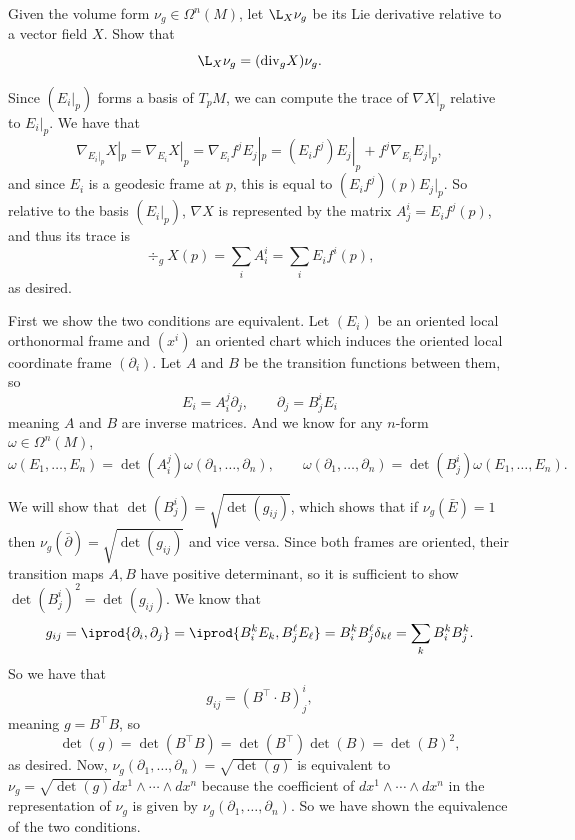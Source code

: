         \item Given the volume form $\nu_g\in\Omega^n(M)$, let $\L_X\nu_g$ be its Lie derivative relative to a vector field $X$.
        Show that
        $$ \L_X\nu_g = (\div_gX)\nu_g . $$
    \eenum

\eprob

\benum
    \item Since $(E_i|_p)$ forms a basis of $T_pM$, we can compute the trace of $\nabla X|_p$ relative to $E_i|_p$.
    We have that
    $$ \nabla_{E_i|_p}X|_p = \nabla_{E_i}X|_p = \nabla_{E_i}f^jE_j|_p = (E_if^j)E_j|_p + f^j\nabla_{E_i}E_j|_p , $$
    and since $E_i$ is a geodesic frame at $p$, this is equal to $(E_if^j)(p)E_j|_p$.
    So relative to the basis $(E_i|_p)$, $\nabla X$ is represented by the matrix $A^i_j=E_if^j(p)$, and thus its trace is
    $$ \div_gX(p) = \sum_i A^i_i = \sum_i E_if^i(p) , $$
    as desired.

    \item First we show the two conditions are equivalent.
    Let $(E_i)$ be an oriented local orthonormal frame and $(x^i)$ an oriented chart which induces the oriented local coordinate frame $(\partial_i)$.
    Let $A$ and $B$ be the transition functions between them, so
    $$ E_i = A^j_i\partial_j,\qquad \partial_j = B^i_jE_i $$
    meaning $A$ and $B$ are inverse matrices.
    And we know for any $n$-form $\omega\in\Omega^n(M)$,
    $$ \omega(E_1,\dots,E_n) = \det(A^j_i)\omega(\partial_1,\dots,\partial_n),\qquad \omega(\partial_1,\dots,\partial_n) = \det(B^i_j)\omega(E_1,\dots,E_n) . $$

    We will show that $\det(B^i_j)=\sqrt{\det(g_{ij})}$, which shows that if $\nu_g(\bar E)=1$ then $\nu_g(\bar\partial)=\sqrt{\det(g_{ij})}$ and vice versa.
    Since both frames are oriented, their transition maps $A,B$ have positive determinant, so it is sufficient to show $\det(B^i_j)^2=\det(g_{ij})$.
    We know that
    $$ g_{ij} = \iprod{\partial_i,\partial_j} = \iprod{B^k_iE_k,B^\ell_jE_\ell} = B^k_iB^\ell_j\delta_{k\ell} = \sum_k B^k_iB^k_j . $$
    So we have that
    $$ g_{ij} = (B^\top\cdot B)^i_j , $$
    meaning $g=B^\top B$, so
    $$ \det(g) = \det(B^\top B) = \det(B^\top)\det(B) = \det(B)^2 , $$
    as desired.
    Now, $\nu_g(\partial_1,\dots,\partial_n)=\sqrt{\det(g)}$ is equivalent to $\nu_g=\sqrt{\det(g)}dx^1\wedge\cdots\wedge dx^n$ because the coefficient of $dx^1\wedge\cdots\wedge dx^n$ in
    the representation of $\nu_g$ is given by $\nu_g(\partial_1,\dots,\partial_n)$.
    So we have shown the equivalence of the two conditions.

